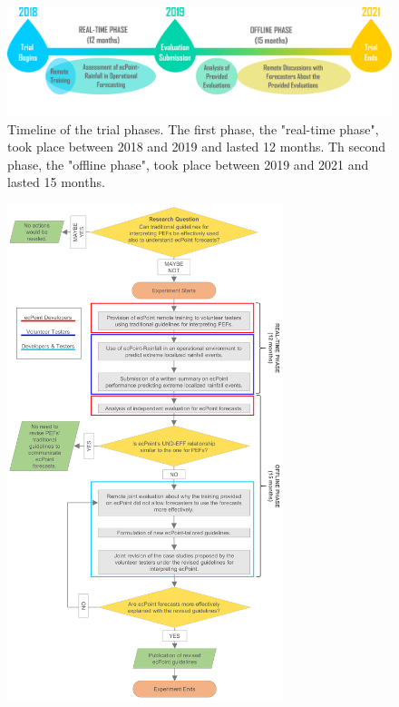 \documentclass[twocol]{ametsocV5} %
\begin{document}
\begin{figure}
\centerline{\includegraphics[width=39pc]{manuscript/Figures/Fig4.png}}
\caption{Timeline of the trial phases. The first phase, the "real-time phase", took place between 2018 and 2019 and lasted 12 months. Th second phase, the "offline phase", took place between 2019 and 2021 and lasted 15 months.}
\label{Fig4}
\end{figure}

\begin{figure}
\centerline{\includegraphics[width=19pc]{manuscript/Figures/FlowChart.png}}

\end{figure}
\end{document}

